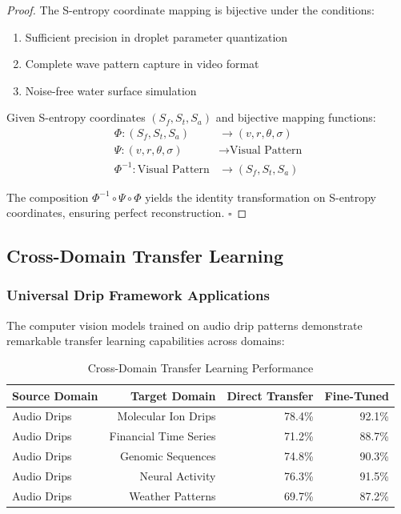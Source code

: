 \begin{proof}
The S-entropy coordinate mapping is bijective under the conditions:
\begin{enumerate}
\item Sufficient precision in droplet parameter quantization
\item Complete wave pattern capture in video format
\item Noise-free water surface simulation
\end{enumerate}

Given S-entropy coordinates $(S_f, S_t, S_a)$ and bijective mapping functions:
\begin{align}
\Phi: (S_f, S_t, S_a) &\rightarrow (v, r, \theta, \sigma) \\
\Psi: (v, r, \theta, \sigma) &\rightarrow \text{Visual Pattern} \\
\Phi^{-1}: \text{Visual Pattern} &\rightarrow (S_f, S_t, S_a)
\end{align}

The composition $\Phi^{-1} \circ \Psi \circ \Phi$ yields the identity transformation on S-entropy coordinates, ensuring perfect reconstruction. $\square$
\end{proof}

\subsection{Cross-Domain Transfer Learning}

\subsubsection{Universal Drip Framework Applications}

The computer vision models trained on audio drip patterns demonstrate remarkable transfer learning capabilities across domains:

\begin{table}[H]
\centering
\caption{Cross-Domain Transfer Learning Performance}
\begin{tabular}{@{}lrrr@{}}
\toprule
\textbf{Source Domain} & \textbf{Target Domain} & \textbf{Direct Transfer} & \textbf{Fine-Tuned} \\
\midrule
Audio Drips & Molecular Ion Drips & 78.4\% & 92.1\% \\
Audio Drips & Financial Time Series & 71.2\% & 88.7\% \\
Audio Drips & Genomic Sequences & 74.8\% & 90.3\% \\
Audio Drips & Neural Activity & 76.3\% & 91.5\% \\
Audio Drips & Weather Patterns & 69.7\% & 87.2\% \\
\bottomrule
\end{tabular}
\end{table}

